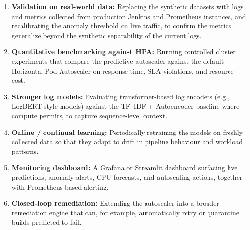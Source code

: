 \documentclass[12pt]{report}
\begin{document}
\begin{enumerate}
    \item \textbf{Validation on real-world data:} Replacing the synthetic datasets with logs and metrics collected from production Jenkins and Prometheus instances, and recalibrating the anomaly threshold on live traffic, to confirm the metrics generalize beyond the synthetic separability of the current logs.
    \item \textbf{Quantitative benchmarking against HPA:} Running controlled cluster experiments that compare the predictive autoscaler against the default Horizontal Pod Autoscaler on response time, SLA violations, and resource cost.
    \item \textbf{Stronger log models:} Evaluating transformer-based log encoders (e.g., LogBERT-style models) against the TF--IDF + Autoencoder baseline where compute permits, to capture sequence-level context.
    \item \textbf{Online / continual learning:} Periodically retraining the models on freshly collected data so that they adapt to drift in pipeline behaviour and workload patterns.
    \item \textbf{Monitoring dashboard:} A Grafana or Streamlit dashboard surfacing live predictions, anomaly alerts, CPU forecasts, and autoscaling actions, together with Prometheus-based alerting.
    \item \textbf{Closed-loop remediation:} Extending the autoscaler into a broader remediation engine that can, for example, automatically retry or quarantine builds predicted to fail.
\end{enumerate}
\end{document}
